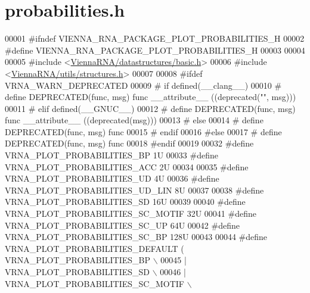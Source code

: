 \hypertarget{probabilities_8h_source}{}\section{probabilities.\+h}
\label{probabilities_8h_source}

\begin{DoxyCode}
00001 \textcolor{preprocessor}{#ifndef VIENNA\_RNA\_PACKAGE\_PLOT\_PROBABILITIES\_H}
00002 \textcolor{preprocessor}{#define VIENNA\_RNA\_PACKAGE\_PLOT\_PROBABILITIES\_H}
00003 
00004 
00005 \textcolor{preprocessor}{#include <\hyperlink{datastructures_2basic_8h}{ViennaRNA/datastructures/basic.h}>}
00006 \textcolor{preprocessor}{#include <\hyperlink{utils_2structures_8h}{ViennaRNA/utils/structures.h}>}
00007 
00008 \textcolor{preprocessor}{#ifdef VRNA\_WARN\_DEPRECATED}
00009 \textcolor{preprocessor}{# if defined(\_\_clang\_\_)}
00010 \textcolor{preprocessor}{#  define DEPRECATED(func, msg) func \_\_attribute\_\_ ((deprecated("", msg)))}
00011 \textcolor{preprocessor}{# elif defined(\_\_GNUC\_\_)}
00012 \textcolor{preprocessor}{#  define DEPRECATED(func, msg) func \_\_attribute\_\_ ((deprecated(msg)))}
00013 \textcolor{preprocessor}{# else}
00014 \textcolor{preprocessor}{#  define DEPRECATED(func, msg) func}
00015 \textcolor{preprocessor}{# endif}
00016 \textcolor{preprocessor}{#else}
00017 \textcolor{preprocessor}{# define DEPRECATED(func, msg) func}
00018 \textcolor{preprocessor}{#endif}
00019 
00032 \textcolor{preprocessor}{#define VRNA\_PLOT\_PROBABILITIES\_BP        1U}
00033 \textcolor{preprocessor}{#define VRNA\_PLOT\_PROBABILITIES\_ACC       2U}
00034 
00035 \textcolor{preprocessor}{#define VRNA\_PLOT\_PROBABILITIES\_UD        4U}
00036 \textcolor{preprocessor}{#define VRNA\_PLOT\_PROBABILITIES\_UD\_LIN    8U}
00037 
00038 \textcolor{preprocessor}{#define VRNA\_PLOT\_PROBABILITIES\_SD        16U}
00039 
00040 \textcolor{preprocessor}{#define VRNA\_PLOT\_PROBABILITIES\_SC\_MOTIF  32U}
00041 \textcolor{preprocessor}{#define VRNA\_PLOT\_PROBABILITIES\_SC\_UP     64U}
00042 \textcolor{preprocessor}{#define VRNA\_PLOT\_PROBABILITIES\_SC\_BP     128U}
00043 
00044 \textcolor{preprocessor}{#define VRNA\_PLOT\_PROBABILITIES\_DEFAULT   (   VRNA\_PLOT\_PROBABILITIES\_BP \(\backslash\)}
00045 \textcolor{preprocessor}{                                            | VRNA\_PLOT\_PROBABILITIES\_SD \(\backslash\)}
00046 \textcolor{preprocessor}{                                            | VRNA\_PLOT\_PROBABILITIES\_SC\_MOTIF \(\backslash\)}

\end{DoxyCode}
